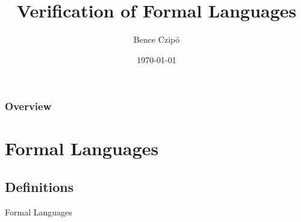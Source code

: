 \documentclass{beamer}
\title[Semester project]{Verification of Formal Languages} %
\author{Bence Czipó} %
\institute[] %
{
École Polytechnique Fédérale de Lausanne \\ %
\medskip
\textit{bence.czipo@epfl.ch} %
}
\date{\today} %
\begin{document}
\begin{frame}
\titlepage %
\end{frame}


%
%

\begin{frame}
\frametitle{Overview} %
\tableofcontents %
\end{frame}


\section{Formal Languages}
\subsection{Definitions}

\begin{frame}
	\Huge{\centerline{Formal Languages}}
\end{frame}
\end{document}
